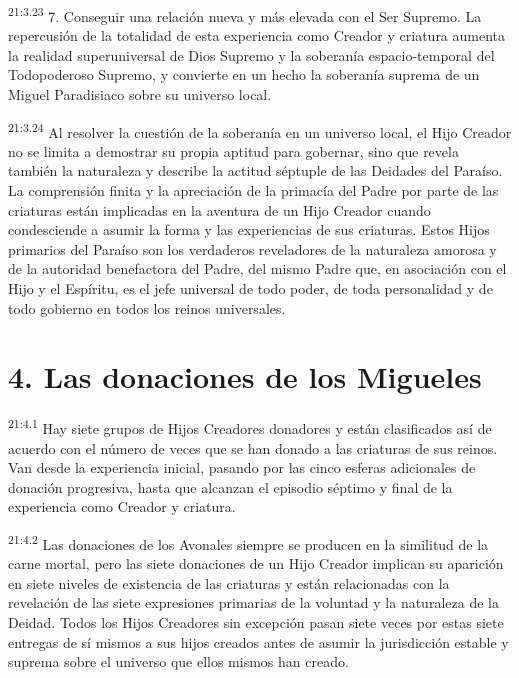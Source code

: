 \par
\textsuperscript{21:3.23} 7. Conseguir una relación nueva y más elevada con el Ser Supremo. La repercusión de la totalidad de esta experiencia como Creador y criatura aumenta la realidad superuniversal de Dios Supremo y la soberanía espacio-temporal del Todopoderoso Supremo, y convierte en un hecho la soberanía suprema de un Miguel Paradisiaco sobre su universo local.

\par
\textsuperscript{21:3.24} Al resolver la cuestión de la soberanía en un universo local, el Hijo Creador no se limita a demostrar su propia aptitud para gobernar, sino que revela también la naturaleza y describe la actitud séptuple de las Deidades del Paraíso. La comprensión finita y la apreciación de la primacía del Padre por parte de las criaturas están implicadas en la aventura de un Hijo Creador cuando condesciende a asumir la forma y las experiencias de sus criaturas. Estos Hijos primarios del Paraíso son los verdaderos reveladores de la naturaleza amorosa y de la autoridad benefactora del Padre, del mismo Padre que, en asociación con el Hijo y el Espíritu, es el jefe universal de todo poder, de toda personalidad y de todo gobierno en todos los reinos universales.

\section*{4. Las donaciones de los Migueles}
\par
\textsuperscript{21:4.1} Hay siete grupos de Hijos Creadores donadores y están clasificados así de acuerdo con el número de veces que se han donado a las criaturas de sus reinos. Van desde la experiencia inicial, pasando por las cinco esferas adicionales de donación progresiva, hasta que alcanzan el episodio séptimo y final de la experiencia como Creador y criatura.

\par
\textsuperscript{21:4.2} Las donaciones de los Avonales siempre se producen en la similitud de la carne mortal, pero las siete donaciones de un Hijo Creador implican su aparición en siete niveles de existencia de las criaturas y están relacionadas con la revelación de las siete expresiones primarias de la voluntad y la naturaleza de la Deidad. Todos los Hijos Creadores sin excepción pasan siete veces por estas siete entregas de sí mismos a sus hijos creados antes de asumir la jurisdicción estable y suprema sobre el universo que ellos mismos han creado.

